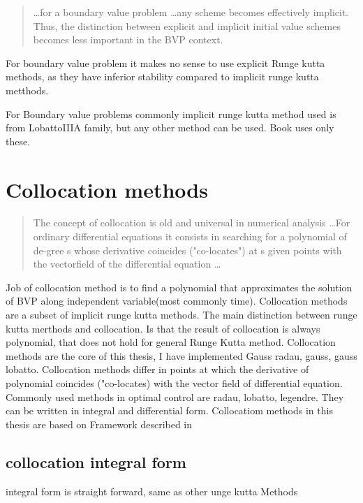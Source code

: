 \begin{quote}
    \ldots for a boundary value problem \ldots any scheme becomes effectively implicit. Thus, the distinction between explicit and implicit initial value schemes becomes less important in the BVP context.
\end{quote}
\cite[p.~69]{Ascher1995}

For boundary value problem it makes no sense to use explicit Runge kutta methods, as they have inferior stability compared to implicit runge kutta metthods.\cite[p.~4]{raoSurveyNumericalMethods2010}

For Boundary value problems commonly implicit runge kutta method used is from LobattoIIIA family, but any other method can be used. Book \cite{betts} uses only these.

\section{Collocation methods}

\begin{quote}
The concept of collocation is old and universal in numerical analysis \ldots For ordinary differential equations it consists in searching for a polynomial of de-gree s whose derivative coincides ("co-locates") at s given points with the vectorfield of the differential equation \ldots
\cite[p.~224]{hairer}	
\end{quote}
Job of collocation method is to find a polynomial that approximates the solution of BVP along independent variable(most commonly time). Collocation methods are a subset of implicit runge kutta methods.
The main distinction between runge kutta merthods and collocation. Is that the result of collocation is always polynomial, that does not hold for general Runge Kutta method.
Collocation methods are the core of this thesis, I have implemented  Gauss radau, gauss, gauss lobatto. Collocation methods differ in points at which the derivative of polynomial coincides ("co-locates) with the vector field of differential equation. Commonly used methods in optimal control are radau, lobatto, legendre. They can be written in integral and differential form\cite{garg_overview_nodate}. Collocatiom methods in this thesis are based on Framework described in\cite{gargUnifiedFrameworkNumerical2010}
\subsection{collocation integral form}
integral form is straight forward,  same as other unge kutta Methods
